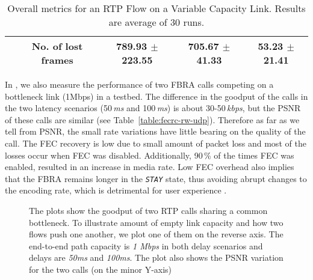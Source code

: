 \begin{table}
{\begin{tabular}{c c c c c}
  & \textbf{No. of lost frames} & 789.93 $\pm$223.55 & 705.67 $\pm$41.33 & 53.23  $\pm$21.41 \\ \hline
  \end{tabular}
  }
  \caption{Overall metrics for an RTP Flow on a Variable Capacity Link.
  Results are average of 30 runs.}
  \label{table:fecrc-var-res}
\end{table}

In , we also measure the performance of two FBRA calls
competing on a bottleneck link (1Mbps) in a testbed. The difference in the
goodput of the calls in the two latency scenarios (50\,\emph{ms} and
100\,\emph{ms}) is about 30-50\,\emph{kbps}, but the PSNR of these calls are
similar (see Table~\ref{table:fecrc-rw-udp}). Therefore as far as we tell from
PSNR, the small rate variations have little bearing on the quality of the
call. The FEC recovery is low due to small amount of packet loss and most of
the losses occur when FEC was disabled. Additionally, 90\,\% of the times FEC
was enabled, resulted in an increase in media rate. Low FEC overhead also
implies that the FBRA remains longer in the \texttt{\emph{STAY}} state, thus
avoiding abrupt changes to the encoding rate, which is detrimental for user
experience \cite{Zink03subjectiveimpression}.



\begin{figure}
  \centerline{
}
\caption{The plots show the goodput of two RTP calls sharing a common
bottleneck. To illustrate amount of empty link capacity and how two flows push
one another, we plot one of them on the reverse axis. The end-to-end path
capacity is \emph{1 Mbps} in both delay scenarios and delays are \emph{50ms}
and \emph{100ms}. The plot also shows the PSNR variation for the two calls (on
the minor Y-axis)}
\label{fig:fecrc-dnet}
\end{figure}


